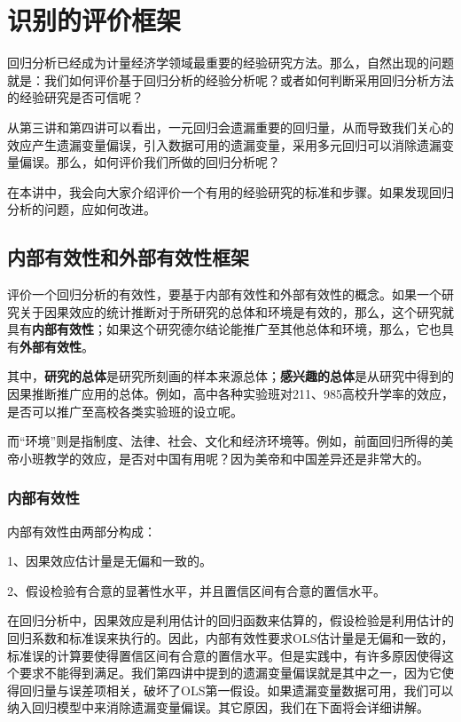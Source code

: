 \documentclass[cn,12pt,math=newtx,citestyle=gb7714-2015,bibstyle=gb7714-2015]{elegantbook}
\begin{document}
\chapter{识别的评价框架}

回归分析已经成为计量经济学领域最重要的经验研究方法。那么，自然出现的问题就是：我们如何评价基于回归分析的经验分析呢？或者如何判断采用回归分析方法的经验研究是否可信呢？

从第三讲和第四讲可以看出，一元回归会遗漏重要的回归量，从而导致我们关心的效应产生遗漏变量偏误，引入数据可用的遗漏变量，采用多元回归可以消除遗漏变量偏误。那么，如何评价我们所做的回归分析呢？

在本讲中，我会向大家介绍评价一个有用的经验研究的标准和步骤。如果发现回归分析的问题，应如何改进。

\section{内部有效性和外部有效性框架}
评价一个回归分析的有效性，要基于内部有效性和外部有效性的概念。如果一个研究关于因果效应的统计推断对于所研究的总体和环境是有效的，那么，这个研究就具有\textbf{内部有效性}；如果这个研究德尔结论能推广至其他总体和环境，那么，它也具有\textbf{外部有效性}。

其中，\textbf{研究的总体}是研究所刻画的样本来源总体；\textbf{感兴趣的总体}是从研究中得到的因果推断推广应用的总体。例如，高中各种实验班对211、985高校升学率的效应，是否可以推广至高校各类实验班的设立呢。

而“环境”则是指制度、法律、社会、文化和经济环境等。例如，前面回归所得的美帝小班教学的效应，是否对中国有用呢？因为美帝和中国差异还是非常大的。

\subsection{内部有效性}
内部有效性由两部分构成：

1、因果效应估计量是无偏和一致的。

2、假设检验有合意的显著性水平，并且置信区间有合意的置信水平。

在回归分析中，因果效应是利用估计的回归函数来估算的，假设检验是利用估计的回归系数和标准误来执行的。因此，内部有效性要求OLS估计量是无偏和一致的，标准误的计算要使得置信区间有合意的置信水平。但是实践中，有许多原因使得这个要求不能得到满足。我们第四讲中提到的遗漏变量偏误就是其中之一，因为它使得回归量与误差项相关，破坏了OLS第一假设。如果遗漏变量数据可用，我们可以纳入回归模型中来消除遗漏变量偏误。其它原因，我们在下面将会详细讲解。
\end{document}
